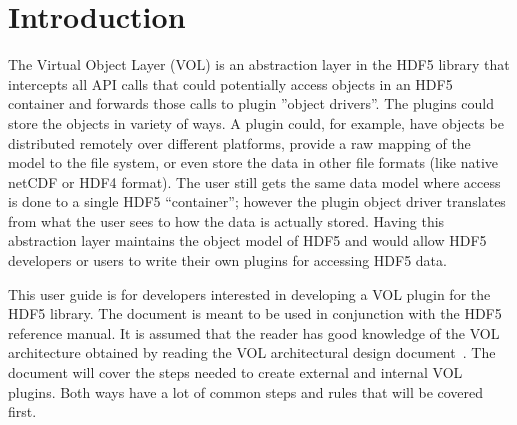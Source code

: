

\section{Introduction}
The Virtual Object Layer (VOL) is an abstraction layer in the HDF5
library that intercepts all API calls that could potentially access
objects in an HDF5 container and forwards those calls to plugin
''object drivers''. The plugins could store the objects in variety of
ways. A plugin could, for example, have objects be distributed
remotely over different platforms, provide a raw mapping of the model
to the file system, or even store the data in other file formats (like
native netCDF or HDF4 format). The user still gets the same data model
where access is done to a single HDF5 “container”; however the plugin
object driver translates from what the user sees to how the data is
actually stored. Having this abstraction layer maintains the object
model of HDF5 and would allow HDF5 developers or users to write their
own plugins for accessing HDF5 data.

This user guide is for developers interested in developing a VOL
plugin for the HDF5 library. The document is meant to be used in
conjunction with the HDF5 reference manual. It is assumed that the
reader has good knowledge of the VOL architecture obtained by reading
the VOL architectural design document~\cite{vol:rfc}. The
document will cover the steps needed to create external and internal
VOL plugins. Both ways have a lot of common steps and rules that will
be covered first.
